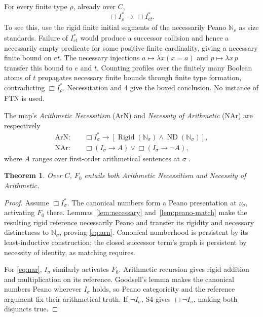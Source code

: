 \documentclass[11pt,letterpaper,numbers=noenddot]{scrartcl}
\numberwithin{equation}{section}
\newtheorem{theorem}{Theorem}[section]
\theoremstyle{definition}
\newcommand{\Rigid}{\operatorname{Rigid}}
\newcommand{\ND}{\operatorname{ND}}
\newcommand{\ArN}{\mathrm{ArN}}
\newcommand{\NAr}{\mathrm{NAr}}
\newcommand{\Ns}{\mathbb N}
\begin{document}
For every finite type $\rho$, already over $C$,
\[
\Box I_\rho^*\longrightarrow\Box I_{et}^*.
\]
To see this, use the rigid finite initial segments of the necessarily Peano $\Ns_\rho$ as size standards. Failure of $I_{et}^*$ would produce a successor collision and hence a necessarily empty predicate for some positive finite cardinality, giving a necessary finite bound on $et$. The necessary injections $a\mapsto\lambda x(x=a)$ and $p\mapsto\lambda x\,p$ transfer this bound to $e$ and $t$. Counting profiles over the finitely many Boolean atoms of $t$ propagates necessary finite bounds through finite type formation, contradicting $\Box I_\rho^*$. Necessitation and 4 give the boxed conclusion. No instance of FTN is used.

The map's \emph{Arithmetic Necessitism} ($\ArN$) and \emph{Necessity of Arithmetic} ($\NAr$) are respectively
\begin{align}
\ArN:\quad&\Box I_\sigma^*\to
 [\Rigid(\Ns_\sigma)\land\ND(\Ns_\sigma)],\label{eq:arn}\\
\NAr:\quad&\Box(I_\sigma\to A)\lor
 \Box(I_\sigma\to\neg A),\label{eq:nar}
\end{align}
where $A$ ranges over first-order arithmetical sentences at $\sigma$ \cite{map,bg}.

\begin{theorem}\label{thm:f0-arith}
Over $C$, $F_0$ entails both Arithmetic Necessitism and Necessity of Arithmetic.
\end{theorem}

\begin{proof}
Assume $\Box I_\sigma^*$. The canonical numbers form a Peano presentation at $\nu_\sigma$, activating $F_0$ there. Lemmas~\ref{lem:necessary} and~\ref{lem:peano-match} make the resulting rigid reference necessarily Peano and transfer its rigidity and necessary distinctness to $\Ns_\sigma$, proving \eqref{eq:arn}. Canonical numberhood is persistent by its least-inductive construction; the closed successor term's graph is persistent by necessity of identity, as matching requires.

For \eqref{eq:nar}, $I_\sigma$ similarly activates $F_0$. Arithmetic recursion gives rigid addition and multiplication on its reference. Goodsell's lemma makes the canonical numbers Peano wherever $I_\sigma$ holds, so Peano categoricity and the reference argument fix their arithmetical truth. If $\neg I_\sigma$, S4 gives $\Box\neg I_\sigma$, making both disjuncts true.
\end{proof}
\end{document}
